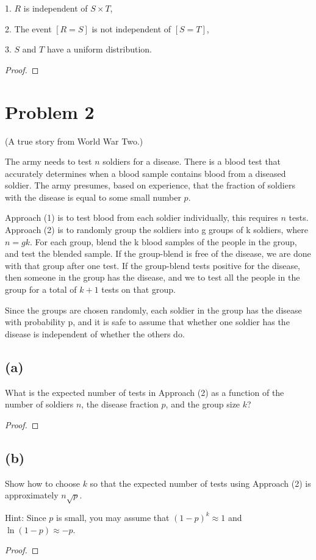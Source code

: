 \documentclass[14pt]{extarticle}
\begin{document}
1. $R$ is independent of $S \times T$,

2. The event $[R = S]$ is not independent of $[S = T]$,

3. $S$ and $T$ have a uniform distribution.
\begin{proof}
\end{proof}

\section{Problem 2}
(A true story from World War Two.)

The army needs to test $n$ soldiers for a disease. There is a blood test that accurately determines when a blood sample contains blood from a diseased soldier. The army presumes, based on experience, that the
fraction of soldiers with the disease is equal to some small number $p$.

Approach (1) is to test blood from each soldier individually, this requires $n$ tests. Approach (2) is to randomly group the soldiers into g groups of k soldiers, where $n = gk$. For each group, blend the k blood samples of the people in the group, and test the blended sample. If the group-blend is free of the disease, we are done with that group after one test. If the group-blend tests positive for the disease, then someone in the group has the disease, and we to test all the people in the group for a total of $k + 1$ tests on that group.

Since the groups are chosen randomly, each soldier in the group has the disease with probability p, and it is safe to assume that whether one soldier has the disease is independent of whether the others do.
\subsection{(a)}
What is the expected number of tests in Approach (2) as a function of the number of soldiers $n$, the disease fraction $p$, and the group size $k$?
\begin{proof}
\end{proof}

\subsection{(b)}
Show how to choose $k$ so that the expected number of tests using Approach (2) is approximately $n \sqrt{p}$.

Hint: Since $p$ is small, you may assume that $(1-p)^k \approx 1$ and $\ln(1-p) \approx -p$.
\begin{proof}
\end{proof}
\end{document}
